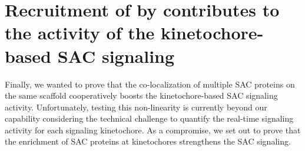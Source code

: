 \section{Recruitment of  by   contributes to the activity of the kinetochore-based SAC signaling}
\label{per_se}

Finally, we wanted to prove that the co-localization of multiple SAC proteins on the same  scaffold cooperatively boosts the kinetochore-based SAC signaling activity. Unfortunately, testing this non-linearity  is currently beyond our capability considering the technical challenge to quantify the real-time signaling activity for each signaling kinetochore. As a compromise, we set out to prove that the enrichment of SAC proteins at kinetochores strengthens the SAC signaling.


